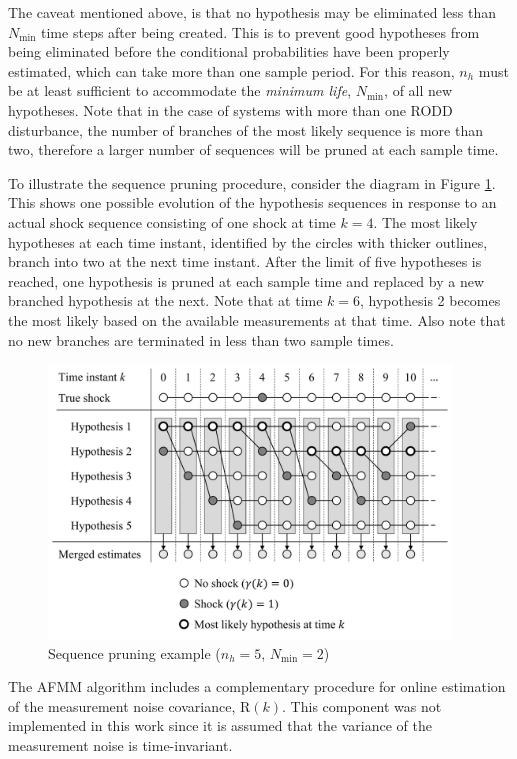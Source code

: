The caveat mentioned above, is that no hypothesis may be eliminated less than $N_\text{min}$ time steps after being created. This is to prevent good hypotheses from being eliminated before the conditional probabilities have been properly estimated, which can take more than one sample period. For this reason, $n_h$ must be at least sufficient to accommodate the \textit{minimum life}, $N_\text{min}$, of all new hypotheses. Note that in the case of systems with more than one \gls{RODD} disturbance, the number of branches of the most likely sequence is more than two, therefore a larger number of sequences will be pruned at each sample time.

To illustrate the sequence pruning procedure, consider the diagram in Figure \ref{fig:mm-obs-seq-SP}. This shows one possible evolution of the hypothesis sequences in response to an actual shock sequence consisting of one shock at time $k=4$.  The most likely hypotheses at each time instant, identified by the circles with thicker outlines, branch into two at the next time instant. After the limit of five hypotheses is reached, one hypothesis is pruned at each sample time and replaced by a new branched hypothesis at the next. Note that at time $k=6$, hypothesis 2 becomes the most likely based on the available measurements at that time. Also note that no new branches are terminated in less than two sample times.
\begin{figure}[ht]
	\centering
	\includegraphics[width=10.7cm]{images/mm_obs_seq_SP.pdf}
	\caption{Sequence pruning example ($n_h=5$, $N_\text{min}=2$)}
	\label{fig:mm-obs-seq-SP}
\end{figure}

The \gls{AFMM} algorithm includes a complementary procedure for online estimation of the measurement noise covariance, $\mathrm{R}(k)$. This component was not implemented in this work since it is assumed that the variance of the measurement noise is time-invariant.

